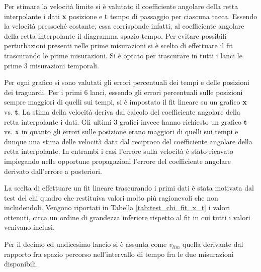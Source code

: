 \documentclass[a4paper,11pt,oneside]{article}
\begin{document}
Per stimare la velocità limite si è valutato il coefficiente angolare della retta interpolante i dati \textbf{x} posizione e \textbf{t} tempo di passaggio per ciascuna tacca. Essendo la velocità pressoché costante, essa corrisponde infatti, al coefficiente angolare della retta interpolante il diagramma spazio tempo.\newline
Per evitare possibili perturbazioni presenti nelle prime misurazioni si è scelto di effettuare il fit trascurando le prime misurazioni. Si è optato per trascurare in tutti i lanci le prime 3 misurazioni temporali.\newline

Per ogni grafico si sono valutati gli errori percentuali dei tempi e delle posizioni dei traguardi.
Per i primi 6 lanci, essendo gli errori percentuali sulle posizioni sempre maggiori di quelli sui tempi, si è impostato il fit lineare su un grafico \textbf{x} vs. \textbf{t}. La stima della velocità deriva dal calcolo del coefficiente angolare della retta interpolante i dati. Gli ultimi 3 grafici invece hanno richiesto un grafico \textbf{t} vs. \textbf{x} in quanto gli errori sulle posizione erano maggiori di quelli sui tempi e dunque una stima delle velocità data dal reciproco del coefficiente angolare della retta interpolante. In entrambi i casi l'errore sulla velocità è stato ricavato impiegando nelle opportune propagazioni l'errore del coefficiente angolare derivato dall'errore a posteriori.\newline

La scelta di effettuare un fit lineare trascurando i primi dati è stata motivata dal test del chi quadro che restituiva valori molto più ragionevoli che non includendoli. Vengono riportati in Tabella \ref{tab:test_chi_fit_x_t} i valori ottenuti, circa un ordine di grandezza inferiore rispetto al fit in cui tutti i valori venivano inclusi.


Per il decimo ed undicesimo lancio si è assunta come $v_{lim}$ quella derivante dal rapporto fra spazio percorso nell'intervallo di tempo fra le due misurazioni disponibili. 

\end{document}
